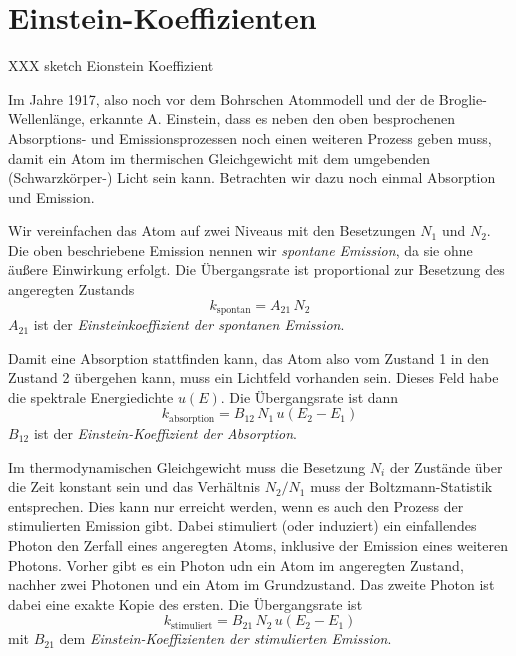 \section{Einstein-Koeffizienten}


XXX sketch Eionstein Koeffizient

Im Jahre 1917, also noch vor dem Bohrschen Atommodell und der de Broglie-Wellenlänge, erkannte A. Einstein, dass es neben den oben besprochenen Absorptions- und Emissionsprozessen noch einen weiteren Prozess geben muss, damit ein Atom im thermischen Gleichgewicht mit dem umgebenden (Schwarzkörper-) Licht sein kann. Betrachten wir dazu noch einmal Absorption und Emission.

Wir vereinfachen das Atom auf zwei Niveaus mit den Besetzungen $N_1$ und $N_2$. Die oben beschriebene Emission nennen wir \emph{spontane Emission}, da sie ohne äußere Einwirkung erfolgt. Die Übergangsrate ist proportional zur Besetzung des angeregten Zustands
\begin{equation}
    k_\text{spontan} = A_{21} \, N_2 \label{eq:7_k_spontan}
\end{equation}
$A_{21}$ ist der \emph{Einsteinkoeffizient der spontanen Emission}.


Damit eine Absorption stattfinden kann, das Atom also vom Zustand 1 in den Zustand 2 übergehen kann, muss ein Lichtfeld vorhanden sein. Dieses Feld habe die spektrale Energiedichte $u(E)$. Die Übergangsrate ist dann
\begin{equation}
    k_\text{absorption} = B_{12} \, N_1 \, u(E_2 - E_1) \label{eq:7_k_abs}
\end{equation}
$B_{12}$ ist der \emph{Einstein-Koeffizient der Absorption}.

Im thermodynamischen Gleichgewicht muss die Besetzung $N_i$ der Zustände über die Zeit konstant sein und das Verhältnis $N_2 / N_1$ muss der Boltzmann-Statistik entsprechen. Dies kann nur erreicht werden, wenn es auch den  Prozess der stimulierten Emission gibt. Dabei stimuliert  (oder induziert) ein einfallendes Photon den Zerfall eines angeregten Atoms, inklusive der Emission eines weiteren Photons. Vorher gibt es ein Photon udn ein Atom im angeregten Zustand, nachher  zwei Photonen und ein Atom im Grundzustand. Das zweite Photon ist dabei eine exakte Kopie des ersten. Die Übergangsrate ist 
\begin{equation}
    k_\text{stimuliert} = B_{21} \, N_2 \, u(E_2 - E_1) \label{eq:7_k_stim}
\end{equation}
mit $B_{21}$ dem  \emph{Einstein-Koeffizienten der stimulierten Emission}.


